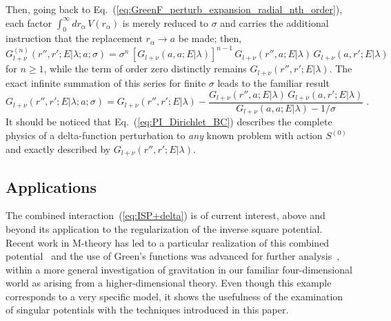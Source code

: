 \documentclass[a4paper,preprint,draft,showpacs,amsmath,amsfonts,amssymb,aps,prd]{revtex4}%
\begin{document}
Then, going back to Eq.~(\ref{eq:GreenF_perturb_expansion_radial_nth_order}),
each factor
$\int_{0}^{\infty}
d r_{\alpha} \,
 V( r_{\alpha})  
$
is merely reduced to $\sigma$ and carries the additional instruction that
the replacement 
$r_{\alpha} \rightarrow a$ be made;
then,
\begin{equation}
G^{(n)}_{l+\nu} 
\left(
\left. 
r'', r' ; E  
\right| \lambda; a; \sigma
\right)
=
\sigma^{n}
\,
\left[
G_{l+\nu}(a,a;E|\lambda) 
\right]^{n-1}
\,
G_{l+\nu} (r'', a ; E| \lambda)
\,
G_{l+\nu} ( a, r' ; E| \lambda)
\;  
\label{eq:reduced_GreenF_delta_perturb_expansion_radial_nth_order}
\end{equation}
for $n \geq 1$, while the term of order zero distinctly remains
$G_{l+\nu} (r'', r' ; E| \lambda) $.
The exact infinite summation of this series 
for finite $\sigma$ leads to the familiar result~\cite{gro:93}
\begin{equation}
G_{l+\nu} 
\left(
\left. 
r'', r' ; E  
\right| \lambda; a; \sigma
\right)
=
G_{l+\nu} (r'', r' ; E| \lambda)
 -
\frac{ G_{l+\nu} (r'', a ; E| \lambda)
\, G_{l+\nu} ( a, r' ; E| \lambda)
}{
G_{l+\nu}(a,a;E|\lambda) 
- 1/\sigma }
\;  .
\label{eq:PI_Dirichlet_BC}
\end{equation}
It should be noticed that 
Eq.~(\ref{eq:PI_Dirichlet_BC})
describes the complete physics of a delta-function perturbation to {\em any\/}
known problem with action  $S^{(0)}$ and
 exactly described by $G_{l+\nu} (r'', r' ; E| \lambda)$.


\subsection{Applications}
\label{sec:applications}


The  combined interaction~(\ref{eq:ISP+delta})
is of current interest, above and beyond its application
to the regularization of the inverse square potential.
Recent work in M-theory has led to a particular
realization of this combined potential~\cite{Randall-Sundrum}
and the use of Green's functions was advanced for further analysis~\cite{Park},
within a more general investigation of gravitation in our
familiar four-dimensional world as arising from a higher-dimensional theory. 
Even though this example corresponds to a 
very specific model, it shows the usefulness of the examination
of singular potentials with the techniques introduced in this paper.
\end{document}
